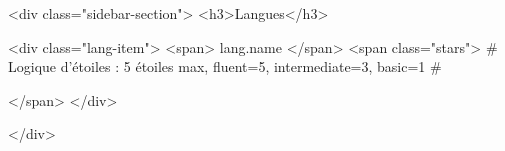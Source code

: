             <div class="sidebar-section">
                <h3>Langues</h3>
                {%
                <div class="lang-item">
                    <span>{{ lang.name }}</span>
                    <span class="stars">
                        {# Logique d'étoiles : 5 étoiles max, fluent=5, intermediate=3, basic=1 #}
                        {%
                        {%
                        {%
                        {%
                        {%
                    </span>
                </div>
                {%
            </div>
            
}}}}}}}

